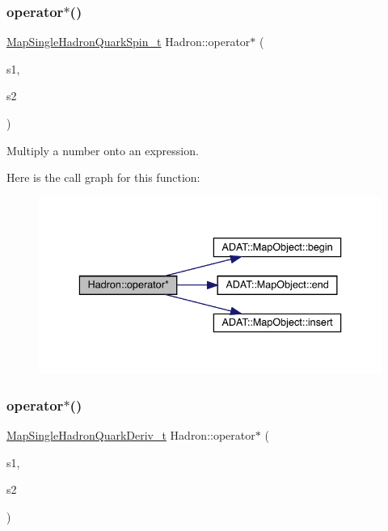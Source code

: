 \subsubsection{\texorpdfstring{operator$\ast$()}{operator*()}\hspace{0.1cm}{\footnotesize\ttfamily [2/6]}}
{\footnotesize\ttfamily \mbox{\hyperlink{namespaceHadron_a22279e56b59508dc8dd2c8991dc911fd}{Map\+Single\+Hadron\+Quark\+Spin\+\_\+t}} Hadron\+::operator$\ast$ (\begin{DoxyParamCaption}\item[{const std\+::complex$<$ double $>$ \&}]{s1,  }\item[{const \mbox{\hyperlink{namespaceHadron_a22279e56b59508dc8dd2c8991dc911fd}{Map\+Single\+Hadron\+Quark\+Spin\+\_\+t}} \&}]{s2 }\end{DoxyParamCaption})}



Multiply a number onto an expression. 

Here is the call graph for this function\+:
\nopagebreak
\begin{figure}[H]
\begin{center}
\leavevmode
\includegraphics[width=336pt]{d1/daf/namespaceHadron_ab9e06323f5f25fbcb53926b3898935a6_cgraph}
\end{center}
\end{figure}
\mbox{\label{namespaceHadron_a559c56047e1679b244bd6770b9f3c3b8}} 
\subsubsection{\texorpdfstring{operator$\ast$()}{operator*()}\hspace{0.1cm}{\footnotesize\ttfamily [3/6]}}
{\footnotesize\ttfamily \mbox{\hyperlink{namespaceHadron_aa588220689caea8a6aad4d0296526e6b}{Map\+Single\+Hadron\+Quark\+Deriv\+\_\+t}} Hadron\+::operator$\ast$ (\begin{DoxyParamCaption}\item[{double}]{s1,  }\item[{const \mbox{\hyperlink{namespaceHadron_aa588220689caea8a6aad4d0296526e6b}{Map\+Single\+Hadron\+Quark\+Deriv\+\_\+t}} \&}]{s2 }\end{DoxyParamCaption})}



